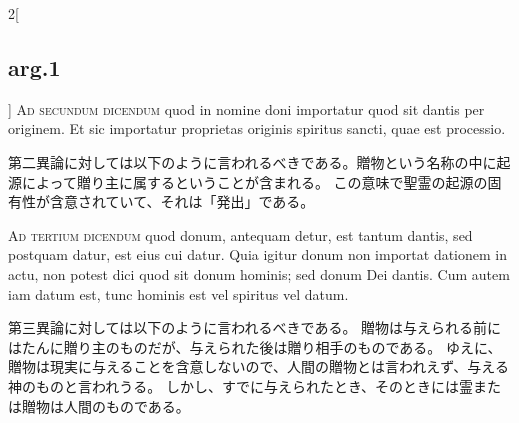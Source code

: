 \documentclass[paper=a4paper,fontsize=10pt,jafontsize=9pt,titlepage]{jlreq}
\begin{document}
\begin{paracol}{2}[\subsection{arg.1}]
\textsc{Ad secundum dicendum} quod in nomine doni importatur quod sit dantis per
originem. Et sic importatur proprietas originis spiritus sancti, quae est
processio.

\switchcolumn

第二異論に対しては以下のように言われるべきである。贈物という名称の中に起源によって贈り主に属するということが含まれる。
この意味で聖霊の起源の固有性が含意されていて、それは「発出」である。

\switchcolumn*[\subsection{ad.3}]

\textsc{Ad tertium dicendum} quod donum, antequam detur, est tantum dantis, sed postquam
datur, est eius cui datur. Quia igitur donum non importat dationem in actu, non
potest dici quod sit donum hominis; sed donum Dei dantis. Cum autem iam datum
est, tunc hominis est vel spiritus vel datum.

\switchcolumn

第三異論に対しては以下のように言われるべきである。
贈物は与えられる前にはたんに贈り主のものだが、与えられた後は贈り相手のものである。
ゆえに、贈物は現実に与えることを含意しないので、人間の贈物とは言われえず、与える神のものと言われうる。
しかし、すでに与えられたとき、そのときには霊または贈物は人間のものである。

\end{paracol}
\end{document}
